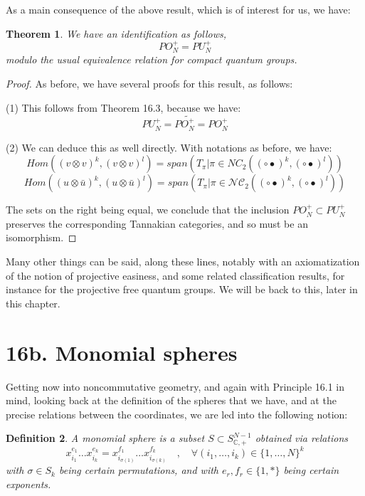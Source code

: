 \documentclass[12pt]{amsbook}
\newtheorem{theorem}{Theorem}[chapter]
\newtheorem{definition}[theorem]{Definition}
\begin{document}
As a main consequence of the above result, which is of interest for us, we have:


\begin{theorem}
We have an identification as follows,
$$PO_N^+=PU_N^+$$
modulo the usual equivalence relation for compact quantum groups.
\end{theorem}

\begin{proof}
As before, we have several proofs for this result, as follows:

\medskip

(1) This follows from Theorem 16.3, because we have:
$$PU_N^+=P\widetilde{O_N^+}=PO_N^+$$

(2) We can deduce this as well directly. With notations as before, we have:
$$Hom\left((v\otimes v)^k,(v\otimes v)^l\right)=span\left(T_\pi\Big|\pi\in NC_2((\circ\bullet)^k,(\circ\bullet)^l)\right)$$
$$Hom\left((u\otimes\bar{u})^k,(u\otimes\bar{u})^l\right)=span\left(T_\pi\Big|\pi\in \mathcal{NC}_2((\circ\bullet)^k,(\circ\bullet)^l)\right)$$

The sets on the right being equal, we conclude that the inclusion $PO_N^+\subset PU_N^+$ preserves the corresponding Tannakian categories, and so must be an isomorphism.
\end{proof}

Many other things can be said, along these lines, notably with an axiomatization of the notion of projective easiness, and some related classification results, for instance for the projective free quantum groups. We will be back to this, later in this chapter.

\section*{16b. Monomial spheres}

Getting now into noncommutative geometry, and again with Principle 16.1 in mind, looking back at the definition of the spheres that we have, and at the precise relations between the coordinates, we are led into the following notion:


\begin{definition}
A monomial sphere is a subset $S\subset S^{N-1}_{\mathbb C,+}$ obtained via relations
$$x_{i_1}^{e_1}\ldots x_{i_k}^{e_k}=x_{i_{\sigma(1)}}^{f_1}\ldots x_{i_{\sigma(k)}}^{f_k}\quad,\quad\forall (i_1,\ldots,i_k)\in\{1,\ldots,N\}^k$$
with $\sigma\in S_k$ being certain permutations, and with $e_r,f_r\in\{1,*\}$ being certain exponents.
\end{definition}
\end{document}

